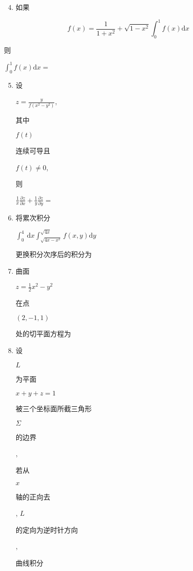\documentclass[10pt]{article}
\begin{document}
\begin{enumerate}
  \setcounter{enumi}{3}
  \item \begin{CJK}{UTF8}{mj}如果\end{CJK}
\end{enumerate}
$$
f(x)=\frac{1}{1+x^{2}}+\sqrt{1-x^{2}} \int_{0}^{1} f(x) \mathrm{d} x
$$
\begin{CJK}{UTF8}{mj}则\end{CJK} $\int_{0}^{1} f(x) \mathrm{d} x=$

\begin{enumerate}
  \setcounter{enumi}{4}
  \item \begin{CJK}{UTF8}{mj}设\end{CJK} $z=\frac{y}{f\left(x^{2}-y^{2}\right)}$, \begin{CJK}{UTF8}{mj}其中\end{CJK} $f(t)$ \begin{CJK}{UTF8}{mj}连续可导且\end{CJK} $f(t) \neq 0$, \begin{CJK}{UTF8}{mj}则\end{CJK} $\frac{1}{x} \frac{\partial z}{\partial x}+\frac{1}{y} \frac{\partial z}{\partial y}=$

  \item \begin{CJK}{UTF8}{mj}将累次积分\end{CJK} $\int_{0}^{4} \mathrm{~d} x \int_{\sqrt{4 x-x^{2}}}^{\sqrt{4 x}} f(x, y) \mathrm{d} y$ \begin{CJK}{UTF8}{mj}更换积分次序后的积分为\end{CJK}

  \item \begin{CJK}{UTF8}{mj}曲面\end{CJK} $z=\frac{1}{2} x^{2}-y^{2}$ \begin{CJK}{UTF8}{mj}在点\end{CJK} $(2,-1,1)$ \begin{CJK}{UTF8}{mj}处的切平面方程为\end{CJK}

  \item \begin{CJK}{UTF8}{mj}设\end{CJK} $L$ \begin{CJK}{UTF8}{mj}为平面\end{CJK} $x+y+z=1$ \begin{CJK}{UTF8}{mj}被三个坐标面所截三角形\end{CJK} $\Sigma$ \begin{CJK}{UTF8}{mj}的边界\end{CJK}, \begin{CJK}{UTF8}{mj}若从\end{CJK} $x$ \begin{CJK}{UTF8}{mj}轴的正向去\end{CJK}, $L$ \begin{CJK}{UTF8}{mj}的定向为逆时针方向\end{CJK}, \begin{CJK}{UTF8}{mj}曲线积分\end{CJK}


\end{enumerate}
\end{document}
